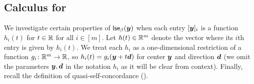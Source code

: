
\subsection{Calculus for \lsetext}
\label{sec:lse_calculus}

We investigate certain properties of $\mathsf{lse}_{\beta}(\bm{y})$ when each entry $[\bm{y}]_i$ is a function $h_i(t)$ for $t \in \mathbb{R}$ for all $i\in[m]$. Let $h(t) \in \mathbb{R}^m$ denote the vector where its $i$th entry is given by $h_i(t)$. We treat each $h_i$ as a one-dimensional restriction of a function $g_i\colon\mathbb{R}^m\rightarrow\mathbb{R}$, so $h_i(t) = g_i(\bm{y}+t\bm{d})$ for center $\bm{y}$ and direction $\bm{d}$ (we omit the parameters $\bm{y},\bm{d}$ in the notation $h_i$ as it will be clear from context). Finally, recall the definition of quasi-self-concordance ().

